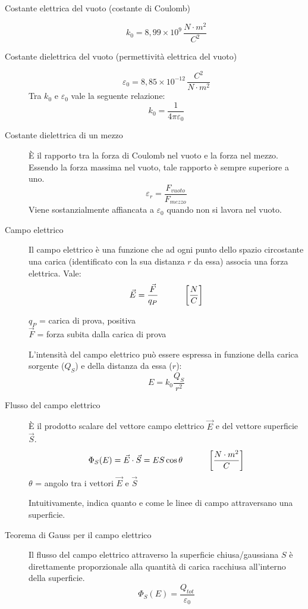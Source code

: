 \documentclass[a4paper,11pt,italian]{article}
\begin{document}
\begin{description}
  \item[Costante elettrica del vuoto (costante di Coulomb)] 
  \[ k_0 = 8,99 \times 10^9 \, \frac{N\cdot m^2}{C^2} \]
  
  \item[Costante dielettrica del vuoto (permettività elettrica del vuoto)]
  \[ \varepsilon_0 = 8,85\times 10^{-12} \, \frac{C^2}{N \cdot m^2} \]
  Tra $ k_0 $ e $ \varepsilon_0 $ vale la seguente relazione:
  \[ k_0 = \frac{1}{4 \pi \varepsilon_0} \]
  
  \item[Costante dielettrica di un mezzo] 
  È il rapporto tra la forza di Coulomb nel vuoto e la forza nel mezzo. Essendo la forza massima nel vuoto, tale rapporto è sempre superiore a uno.
  \[ \varepsilon_r = \frac{F_{vuoto}}{F_{mezzo}} \]
  Viene sostanzialmente affiancata a $ \varepsilon_0 $ quando non si lavora nel vuoto.

  \item[Campo elettrico] 
  Il campo elettrico è una funzione che ad ogni punto dello spazio circostante una carica (identificato con la sua distanza $ r $ da essa) associa una forza elettrica. Vale:
  \[ \vec{E}  = \frac{\vec{F}}{q_P} \hspace*{3em} \left[ \frac{N}{C} \right] \]
  \begin{multicols}{2}
  $ q_P $ = carica di prova, positiva\\
  $ \vec{F}  $ = forza subita dalla carica di prova
  \end{multicols}
  
  L'intensità del campo elettrico può essere espressa in funzione della carica sorgente ($ Q_S $) e della distanza da essa ($ r $):
  \[ E = k_0 \frac{Q_S}{r^2}  \]
    
  \item[Flusso del campo elettrico] 
  È il prodotto scalare del vettore campo elettrico $ \vec{E} $ e del vettore superficie $ \vec{S} $.
  \[ \Phi_S(E) = \vec{E} \cdot \vec{S} = ES \cos \theta \hspace*{3em} \left[ \frac{N\cdot m^2}{C} \right] \]
  $ \theta $ = angolo tra i vettori $ \vec{E} $ e $ \vec{S} $
  
  Intuitivamente, indica quanto e come le linee di campo attraversano una superficie.
    
  \item[Teorema di Gauss per il campo elettrico] 
  Il flusso del campo elettrico attraverso la superficie chiusa/gaussiana $ S $ è direttamente proporzionale alla quantità di carica racchiusa all'interno della superficie.
  \[ \Phi_S(E) = \frac{Q_{tot}}{\varepsilon_0} \]
  

\end{description}
\end{document}
